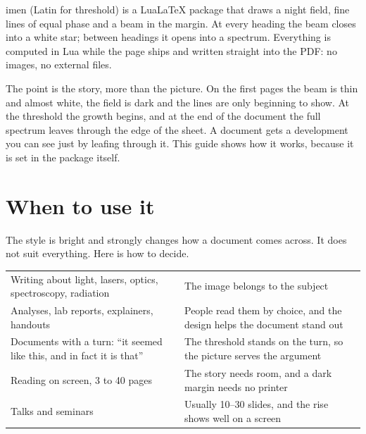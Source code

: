 \documentclass[10pt,a4paper]{article}
\begin{document}

imen (Latin for threshold) is a LuaLaTeX package that draws a night field, fine lines of equal phase and a beam in the margin. At every heading the beam closes into a white star; between headings it opens into a spectrum. Everything is computed in Lua while the page ships and written straight into the PDF: no images, no external files.

The point is the story, more than the picture. On the first pages the beam is thin and almost white, the field is dark and the lines are only beginning to show. At the threshold the growth begins, and at the end of the document the full spectrum leaves through the edge of the sheet. A document gets a development you can see just by leafing through it. This guide shows how it works, because it is set in the package itself.


\begingroup\small\setlength\parskip{0pt}\tableofcontents\endgroup

\section{When to use it}

The style is bright and strongly changes how a document comes across. It does not suit everything. Here is how to decide.

\medskip
\noindent\begin{tabularx}{\linewidth}{@{}P{42mm}L@{}}
\toprule
{} & \\\midrule
Writing about light, lasers, optics, spectroscopy, radiation & The image belongs to the subject\\
Analyses, lab reports, explainers, handouts & People read them by choice, and the design helps the document stand out\\
Documents with a turn: ``it seemed like this, and in fact it is that'' & The threshold stands on the turn, so the picture serves the argument\\
Reading on screen, 3 to 40 pages & The story needs room, and a dark margin needs no printer\\
Talks and seminars & Usually 10--30 slides, and the rise shows well on a screen\\
\bottomrule
\end{tabularx}
\end{document}
